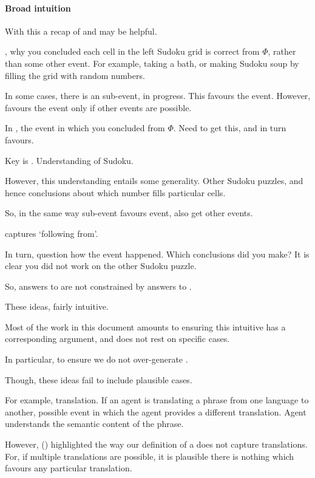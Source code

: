 \paragraph*{Broad intuition}



\begin{note}
  With this a recap of \qWhy{} and \qHow{} may be helpful.

  \qWhy{}, why you concluded each cell in the left Sudoku grid is correct from \(\Phi\), rather than some other event.
  For example, taking a bath, or making Sudoku soup by filling the grid with random numbers.

  In some cases, there is an sub-event, in progress.
  This favours the event.
  However, favours the event only if other events are possible.

  In , the event in which you concluded  from \(\Phi\).
  Need to get this, and in turn favours.

  Key is \pool{}.
  Understanding of Sudoku.

  However, this understanding entails some generality.
  Other Sudoku puzzles, and hence conclusions about which number fills particular cells.

  So, in the same way sub-event favours event, also get other events.

  \ros{} captures `following from'.

  In turn, \qHow{} question how the event happened.
  Which conclusions did you make?
  It is clear you did not work on the other Sudoku puzzle.

  So, answers to \qWhy{} are not constrained by answers to \qHow{}.
\end{note}


\begin{note}
  These ideas, fairly intuitive.

  Most of the work in this document amounts to ensuring this intuitive has a corresponding argument, and does not rest on specific cases.

  In particular,  to ensure we do not over-generate .

  Though, these ideas fail to include plausible cases.

  For example, translation.
  If an agent is translating a phrase from one language to another, possible event in which the agent provides a different translation.
  Agent understands the semantic content of the phrase.

  However,  () highlighted the way our definition of a  does not capture translations.
  For, if multiple translations are possible, it is plausible there is nothing which favours any particular translation.
\end{note}


